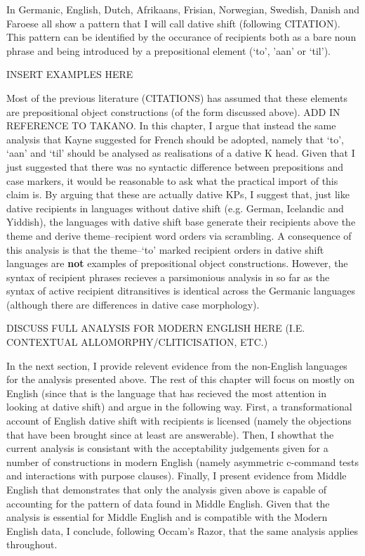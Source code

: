 \documentclass[11pt]{upenndiss}
\begin{document}
In Germanic, English, Dutch, Afrikaans, Frisian, Norwegian, Swedish, Danish and Faroese all show a pattern that I will call dative shift (following CITATION). This pattern can be identified by the occurance of recipients both as a bare noun phrase and being introduced by a prepositional element (`to', 'aan' or `til').  

INSERT EXAMPLES HERE

Most of the previous literature (CITATIONS) has assumed that these elements are prepositional object constructions (of the form discussed above). ADD IN REFERENCE TO TAKANO. In this chapter, I argue that instead the same analysis that Kayne suggested for French should be adopted, namely that `to', `aan' and `til' should be analysed as realisations of a dative K head. Given that I just suggested that there was no syntactic difference between prepositions and case markers, it would be reasonable to ask what the practical import of this claim is. By arguing that these are actually dative KPs, I suggest that, just like dative recipients in languages without dative shift (e.g. German, Icelandic and Yiddish), the languages with dative shift base generate their recipients above the theme and derive theme--recipient word orders via scrambling. A consequence of this analysis is that the theme--`to' marked recipient orders in dative shift languages are \textbf{not} examples of prepositional object constructions. However, the syntax of recipient phrases recieves a parsimonious analysis in so far as the syntax of active recipient ditransitives is identical across the Germanic languages (although there are differences in dative case morphology).

DISCUSS FULL ANALYSIS FOR MODERN ENGLISH HERE (I.E. CONTEXTUAL ALLOMORPHY/CLITICISATION, ETC.)

In the next section, I provide relevent evidence from the non-English languages for the analysis presented above. The rest of this chapter will focus on mostly on English (since that is the language that has recieved the most attention in looking at dative shift) and argue in the following way. First, a transformational account of English dative shift with recipients is licensed (namely the objections that have been brought since at least \citet{Oehrle.1976} are answerable). Then, I showthat the current analysis is consistant with the acceptability judgements given for a number of constructions in modern English (namely asymmetric c-command tests and interactions with purpose clauses). Finally, I present evidence from Middle English that demonstrates that only the analysis given above is capable of accounting for the pattern of data found in Middle English. Given that the analysis is essential for Middle English and is compatible with the Modern English data, I conclude, following Occam's Razor, that the same analysis applies throughout.
\end{document}
